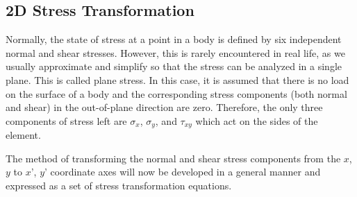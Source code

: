 \documentclass[a4paper,openany,12pt]{book}
\begin{document}
\subsection{2D Stress Transformation}
\label{d-stress-transformation}
Normally, the state of stress at a point in a body is defined by six
independent normal and shear stresses. However, this is rarely
encountered in real life, as we usually approximate and simplify so that
the stress can be analyzed in a single plane. This is called plane
stress. In this case, it is assumed that there is no load on the surface
of a body and the corresponding stress components (both normal and
shear) in the out-of-plane direction are zero. Therefore, the only three
components of stress left are \(\sigma_x\), \(\sigma_y\), and \(\tau_{xy}\)
which act on the sides of the element.

The method of transforming the normal and shear stress components from
the \(x\), \(y\) to \(x’\), \(y’\) coordinate axes will now be developed in a
general manner and expressed as a set of stress transformation
equations.
\end{document}
